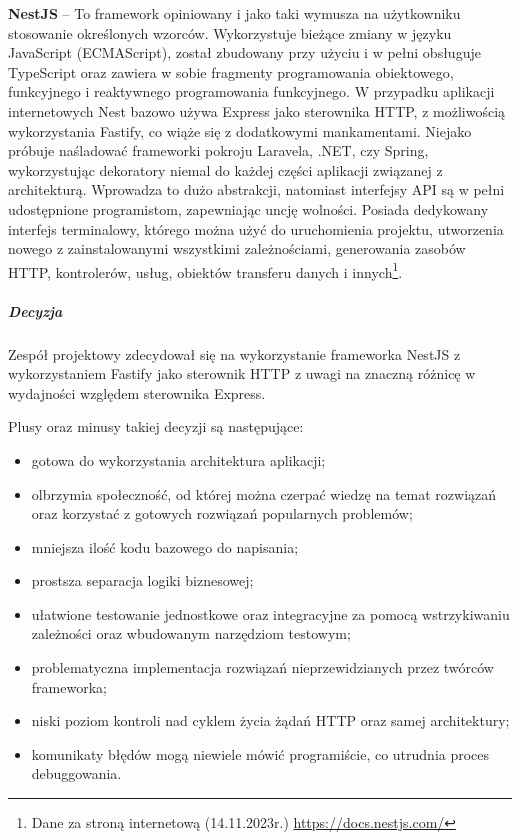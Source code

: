 \documentclass[12pt, a4paper, twoside, openany]{book}
\begin{document}
\textbf{NestJS} -- To framework opiniowany i jako taki wymusza na użytkowniku stosowanie określonych wzorców.
Wykorzystuje bieżące zmiany w języku JavaScript (ECMAScript), został zbudowany przy użyciu i w pełni obsługuje TypeScript oraz zawiera w sobie fragmenty
programowania obiektowego, funkcyjnego i reaktywnego programowania funkcyjnego.
W przypadku aplikacji internetowych Nest bazowo używa Express jako sterownika HTTP,
z możliwością wykorzystania Fastify, co wiąże się z dodatkowymi mankamentami. Niejako próbuje naśladować frameworki pokroju Laravela,
.NET, czy Spring, wykorzystując dekoratory niemal do każdej części aplikacji związanej z architekturą. Wprowadza to dużo abstrakcji, natomiast interfejsy API są w pełni udostępnione programistom, zapewniając uncję wolności.
Posiada dedykowany interfejs terminalowy, którego można użyć do uruchomienia projektu,
utworzenia nowego z zainstalowanymi wszystkimi zależnościami, generowania zasobów HTTP,
kontrolerów, usług, obiektów transferu danych i innych\footnote{Dane za stroną internetową (14.11.2023r.) \url{https://docs.nestjs.com/}}.

\subparagraph{Decyzja\\}

Zespół projektowy zdecydował się na wykorzystanie frameworka NestJS z wykorzystaniem
Fastify jako sterownik HTTP z uwagi na znaczną różnicę w wydajności względem sterownika Express.

Plusy oraz minusy takiej decyzji są następujące:

\begin{itemize}
    \item gotowa do wykorzystania architektura aplikacji;
    \item olbrzymia społeczność, od której można czerpać wiedzę na temat rozwiązań 
    oraz korzystać z gotowych rozwiązań popularnych problemów;
    \item mniejsza ilość kodu bazowego do napisania;
    \item prostsza separacja logiki biznesowej;
    \item ułatwione testowanie jednostkowe oraz integracyjne za pomocą wstrzykiwaniu
    zależności oraz wbudowanym narzędziom testowym;
    \item problematyczna implementacja rozwiązań nieprzewidzianych przez twórców
    frameworka;
    \item niski poziom kontroli nad cyklem życia żądań HTTP oraz samej architektury;
    \item komunikaty błędów mogą niewiele mówić programiście, co utrudnia proces debuggowania.
\end{itemize}
\end{document}
